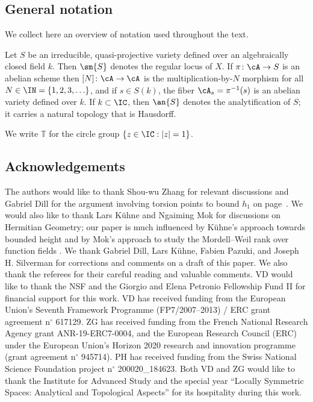 \subsection{General notation}
We collect here an overview of notation used throughout the text.

Let $S$ be an irreducible, quasi-projective variety defined over an
algebraically closed field $k$. Then $\sm{S}$ denotes the regular
locus of $X$. If $\pi\colon \cA\rightarrow S$ is an abelian scheme
then $[N]\colon \cA\rightarrow\cA$ is the multiplication-by-$N$
morphism for all $N\in\IN=\{1,2,3,\ldots\}$, and if $s\in S(k)$, the fiber
$\cA_s=\pi^{-1}(s)$ is an abelian variety defined over $k$.
If $k\subset \IC$, then
$\an{S}$ denotes the analytification of $S$; it carries a natural
topology that is Hausdorff.

We write $\mathbb{T}$ for the circle group $\{z\in \IC : |z|=1\}$.

\subsection*{Acknowledgements} The authors would like to thank
Shou-wu Zhang for relevant discussions and Gabriel Dill for the
argument involving torsion points to bound $h_1$ on
page~\pageref{page:boundh1}.
We would also like
to thank Lars K\"uhne and Ngaiming Mok  for discussions on Hermitian Geometry; our paper
is much influenced by K\"uhne's approach towards bounded height
\cite{kuehne:semiabelianbhc}
and by Mok's approach to study the Mordell--Weil rank over function
fields \cite{Mok11Form}.
We thank Gabriel Dill, Lars K\"uhne, Fabien Pazuki, and Joseph H. Silverman for corrections and comments
on a draft of this paper.
We also thank the referees for their careful reading and valuable comments.
VD would like
to thank the NSF and the Giorgio and Elena Petronio Fellowship Fund II
for financial support for this work. VD has received funding from the European Union's Seventh Framework Programme (FP7/2007--2013) / ERC grant agreement n$^\circ$ 617129. ZG has received
funding from the French National Research Agency grant
ANR-19-ERC7-0004, and the European Research Council (ERC) under the
European Union's Horizon 2020 research and innovation programme (grant
agreement n$^\circ$ 945714). PH has received funding
from the Swiss National Science Foundation project n$^\circ$ 200020\_184623.
Both VD and ZG would like to
thank the Institute for Advanced Study and the special year ``Locally
Symmetric Spaces: Analytical and Topological Aspects'' for its
hospitality during this work.





